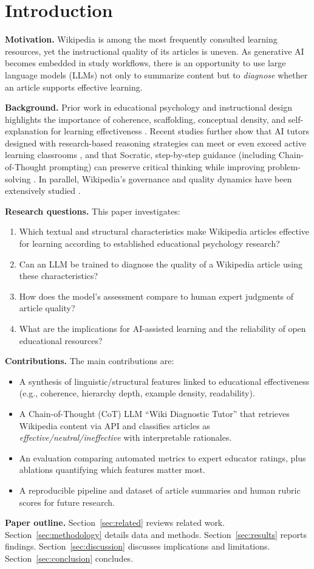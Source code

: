 
\section{Introduction}

\textbf{Motivation.} Wikipedia is among the most frequently consulted learning resources, yet the instructional quality of its articles is uneven. As generative AI becomes embedded in study workflows, there is an opportunity to use large language models (LLMs) not only to summarize content but to \emph{diagnose} whether an article supports effective learning.

\textbf{Background.} Prior work in educational psychology and instructional design highlights the importance of coherence, scaffolding, conceptual density, and self-explanation for learning effectiveness \cite{ekholm2018clarifying, pithers2000critical, catlr2019selfexplanation}. Recent studies further show that AI tutors designed with research-based reasoning strategies can meet or even exceed active learning classrooms \cite{kestin2025aitutor}, and that Socratic, step-by-step guidance (including Chain-of-Thought prompting) can preserve critical thinking while improving problem-solving \cite{ding2024socratic, ibm2025cot}. In parallel, Wikipedia’s governance and quality dynamics have been extensively studied \cite{reagle2010good, worku2020exploring}.

\textbf{Research questions.} This paper investigates:
\begin{enumerate}
  \item Which textual and structural characteristics make Wikipedia articles effective for learning according to established educational psychology research?
  \item Can an LLM be trained to diagnose the quality of a Wikipedia article using these characteristics?
  \item How does the model’s assessment compare to human expert judgments of article quality?
  \item What are the implications for AI-assisted learning and the reliability of open educational resources?
\end{enumerate}

\textbf{Contributions.} The main contributions are:
\begin{itemize}
  \item A synthesis of linguistic/structural features linked to educational effectiveness (e.g., coherence, hierarchy depth, example density, readability).
  \item A Chain-of-Thought (CoT) LLM “Wiki Diagnostic Tutor” that retrieves Wikipedia content via API and classifies articles as \emph{effective/neutral/ineffective} with interpretable rationales.
  \item An evaluation comparing automated metrics to expert educator ratings, plus ablations quantifying which features matter most.
  \item A reproducible pipeline and dataset of article summaries and human rubric scores for future research.
\end{itemize}

\textbf{Paper outline.} Section~\ref{sec:related} reviews related work. Section~\ref{sec:methodology} details data and methods. Section~\ref{sec:results} reports findings. Section~\ref{sec:discussion} discusses implications and limitations. Section~\ref{sec:conclusion} concludes.
